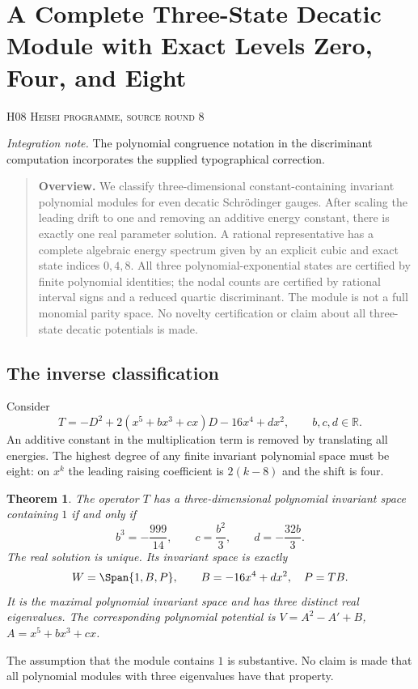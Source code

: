 \documentclass[11pt,a4paper]{article}
\newtheorem{theorem}{Theorem}[section]
\theoremstyle{definition}\newtheorem{definition}[theorem]{Definition}
\theoremstyle{remark}\newtheorem{remark}[theorem]{Remark}
\newcommand{\R}{\mathbb R}\newcommand{\C}{\mathbb C}\newcommand{\N}{\mathbb N}
\numberwithin{equation}{section}
\begin{document}
\clearpage
\section[H08 --- A Complete Three-State Decatic Module with Exact Levels Zero, Four, and Eight]{A Complete Three-State Decatic Module with Exact Levels Zero, Four, and Eight}\label{contrib-H08}
\noindent\textsc{H08 \quad Heisei programme, source round 8}\par\medskip
\noindent\textit{Integration note.} The polynomial congruence notation in the discriminant computation incorporates the supplied typographical correction.\par\medskip






\begin{quote}\small\textbf{Overview.} We classify three-dimensional constant-containing invariant polynomial modules for even decatic Schr\"odinger gauges. After scaling the leading drift to one and removing an additive energy constant, there is exactly one real parameter solution. A rational representative has a complete algebraic energy spectrum given by an explicit cubic and exact state indices $0,4,8$. All three polynomial-exponential states are certified by finite polynomial identities; the nodal counts are certified by rational interval signs and a reduced quartic discriminant. The module is not a full monomial parity space. No novelty certification or claim about all three-state decatic potentials is made.\end{quote}
\subsection{The inverse classification}\label{H08-sec-1}
Consider
\[T=-D^2+2(x^5+bx^3+cx)D-16x^4+dx^2,
\qquad b,c,d\in\R.
\]
An additive constant in the multiplication term is removed by translating all energies. The highest degree of any finite invariant polynomial space must be eight: on $x^k$ the leading raising coefficient is $2(k-8)$ and the shift is four.
\begin{theorem}\label{H08-classification}
The operator $T$ has a three-dimensional polynomial invariant space containing $1$ if and only if
\begin{equation}\label{H08-bc}
 b^3=-\frac{999}{14},\qquad c=\frac{b^2}{3},\qquad d=-\frac{32b}{3}.
\end{equation}
The real solution is unique. Its invariant space is exactly
\[W=\Span\{1,B,P\},\qquad B=-16x^4+dx^2,\quad P=TB.
\]
It is the maximal polynomial invariant space and has three distinct real eigenvalues. The corresponding polynomial potential is $V=A^2-A'+B$, $A=x^5+bx^3+cx$.
\end{theorem}
The assumption that the module contains $1$ is substantive. No claim is made that all polynomial modules with three eigenvalues have that property.
\end{document}
